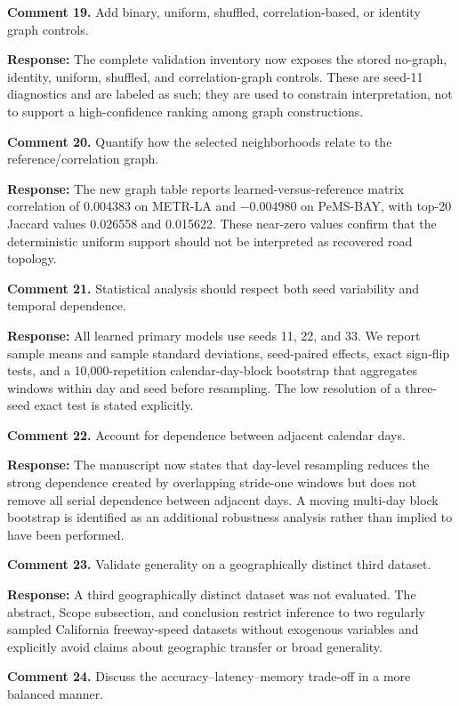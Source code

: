 \documentclass[11pt]{article}
\newcommand{\response}[1]{\par\noindent\textcolor{responseblue}{\textbf{Response:} #1}\par}
\begin{document}
\textbf{Comment 19.} Add binary, uniform, shuffled, correlation-based, or identity graph controls.

\response{The complete validation inventory now exposes the stored no-graph, identity, uniform, shuffled, and correlation-graph controls. These are seed-11 diagnostics and are labeled as such; they are used to constrain interpretation, not to support a high-confidence ranking among graph constructions.}

\textbf{Comment 20.} Quantify how the selected neighborhoods relate to the reference/correlation graph.

\response{The new graph table reports learned-versus-reference matrix correlation of 0.004383 on METR-LA and $-0.004980$ on PeMS-BAY, with top-20 Jaccard values 0.026558 and 0.015622. These near-zero values confirm that the deterministic uniform support should not be interpreted as recovered road topology.}

\textbf{Comment 21.} Statistical analysis should respect both seed variability and temporal dependence.

\response{All learned primary models use seeds 11, 22, and 33. We report sample means and sample standard deviations, seed-paired effects, exact sign-flip tests, and a 10,000-repetition calendar-day-block bootstrap that aggregates windows within day and seed before resampling. The low resolution of a three-seed exact test is stated explicitly.}

\textbf{Comment 22.} Account for dependence between adjacent calendar days.

\response{The manuscript now states that day-level resampling reduces the strong dependence created by overlapping stride-one windows but does not remove all serial dependence between adjacent days. A moving multi-day block bootstrap is identified as an additional robustness analysis rather than implied to have been performed.}

\textbf{Comment 23.} Validate generality on a geographically distinct third dataset.

\response{A third geographically distinct dataset was not evaluated. The abstract, Scope subsection, and conclusion restrict inference to two regularly sampled California freeway-speed datasets without exogenous variables and explicitly avoid claims about geographic transfer or broad generality.}

\textbf{Comment 24.} Discuss the accuracy--latency--memory trade-off in a more balanced manner.
\end{document}
